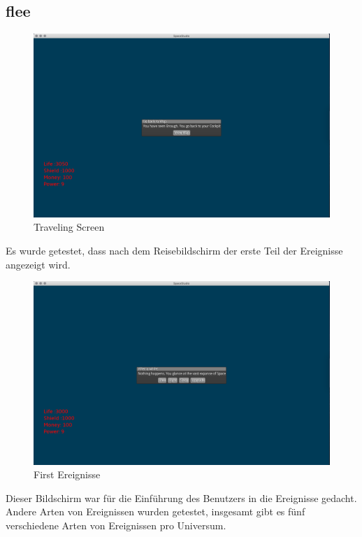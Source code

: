 \documentclass[12pt]{article}
\begin{document}
\subsection{flee}
\begin{figure}[htp]
\centering
\includegraphics[scale=0.3]{TestProtocolBilder/flee.png}
\caption{Traveling Screen}
\end{figure}
\newpage
Es wurde getestet, dass nach dem Reisebildschirm der erste Teil der Ereignisse angezeigt wird.\\
\begin{figure}[htp]
\centering
\includegraphics[scale=0.3]{TestProtocolBilder/InitialGeeinisse.png}
\caption{First Ereignisse}
\end{figure}
Dieser Bildschirm war für die Einführung des Benutzers in die Ereignisse gedacht.
\newpage
Andere Arten von Ereignissen wurden getestet, insgesamt gibt es fünf verschiedene Arten von Ereignissen pro Universum.
\end{document}
